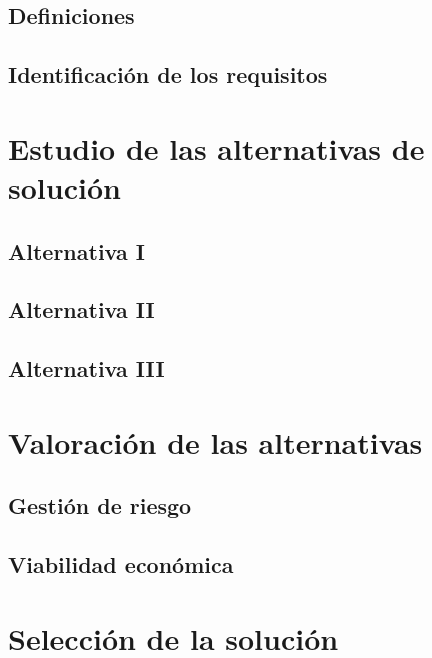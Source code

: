 \documentclass[10pt,a4paper,oldfontcommands]{dpds}
\begin{document}
\subsection{Definiciones}
\subsection{Identificación de los requisitos}


\section{Estudio de las alternativas de solución}
\subsection{Alternativa I}
\subsection{Alternativa II}
\subsection{Alternativa III}

\section{Valoración de las alternativas}
\subsection{Gestión de riesgo}
\subsection{Viabilidad económica}

\section{Selección de la solución}
\end{document}
